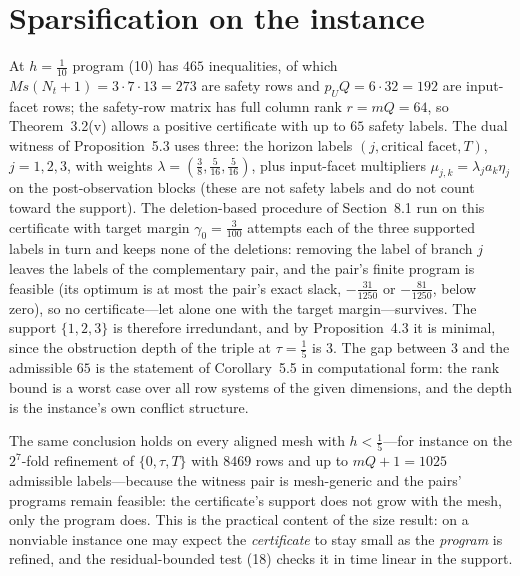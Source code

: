\documentclass[11pt,a4paper]{article}
\theoremstyle{plain}
\theoremstyle{definition}
\theoremstyle{remark}
\newcommand{\tfr}[2]{\tfrac{#1}{#2}}
\begin{document}
\section{Sparsification on the instance}\label{S:sparsification}

At $h=\tfr1{10}$ program (10) has $465$ inequalities, of which $Ms(N_t+1)=3\cdot7\cdot13=273$ are safety rows and $p_UQ=6\cdot32=192$ are input-facet rows; the safety-row matrix has full column rank $r=mQ=64$, so Theorem~3.2(v) allows a positive certificate with up to $65$ safety labels. The dual witness of Proposition~5.3 uses three: the horizon labels $(j,\text{critical facet},T)$, $j=1,2,3$, with weights $\lambda=(\tfr38,\tfr5{16},\tfr5{16})$, plus input-facet multipliers $\mu_{j,k}=\lambda_ja_k\eta_j$ on the post-observation blocks (these are not safety labels and do not count toward the support). The deletion-based procedure of Section~8.1 run on this certificate with target margin $\gamma_0=\tfr3{100}$ attempts each of the three supported labels in turn and keeps none of the deletions: removing the label of branch $j$ leaves the labels of the complementary pair, and the pair's finite program is feasible (its optimum is at most the pair's exact slack, $-\tfr{31}{1250}$ or $-\tfr{81}{1250}$, below zero), so no certificate---let alone one with the target margin---survives. The support $\{1,2,3\}$ is therefore irredundant, and by Proposition~4.3 it is minimal, since the obstruction depth of the triple at $\tau=\tfr15$ is $3$. The gap between $3$ and the admissible $65$ is the statement of Corollary~5.5 in computational form: the rank bound is a worst case over all row systems of the given dimensions, and the depth is the instance's own conflict structure.

The same conclusion holds on every aligned mesh with $h<\tfr15$---for instance on the $2^7$-fold refinement of $\{0,\tau,T\}$ with $8469$ rows and up to $mQ+1=1025$ admissible labels---because the witness pair is mesh-generic and the pairs' programs remain feasible: the certificate's support does not grow with the mesh, only the program does. This is the practical content of the size result: on a nonviable instance one may expect the \emph{certificate} to stay small as the \emph{program} is refined, and the residual-bounded test (18) checks it in time linear in the support.
\end{document}
